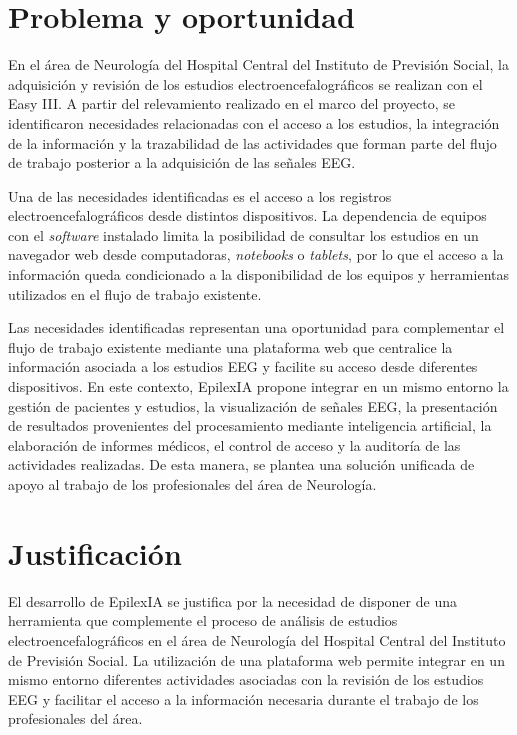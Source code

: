 \section{Problema y oportunidad}
\label{sec:problema-oportunidad}

En el área de Neurología del Hospital Central del Instituto de Previsión Social, la adquisición y revisión de los estudios electroencefalográficos se realizan con el Easy III. A partir del relevamiento realizado en el marco del proyecto, se identificaron necesidades relacionadas con el acceso a los estudios, la integración de la información y la trazabilidad de las actividades que forman parte del flujo de trabajo posterior a la adquisición de las señales EEG.

Una de las necesidades identificadas es el acceso a los registros electroencefalográficos desde distintos dispositivos. La dependencia de equipos con el \textit{software} instalado limita la
posibilidad de consultar los estudios en un navegador web desde computadoras, \textit{notebooks} o \textit{tablets}, por lo que el acceso a la información queda condicionado a la disponibilidad de los equipos y herramientas utilizados en el flujo de trabajo existente.

Las necesidades identificadas representan una oportunidad para
complementar el flujo de trabajo existente mediante una plataforma web
que centralice la información asociada a los estudios EEG y facilite
su acceso desde diferentes dispositivos. En este contexto, EpilexIA
propone integrar en un mismo entorno la gestión de pacientes y estudios,
la visualización de señales EEG, la presentación de resultados
provenientes del procesamiento mediante inteligencia artificial,
la elaboración de informes médicos, el control de acceso y la
auditoría de las actividades realizadas. De esta manera, se plantea
una solución unificada de apoyo al trabajo de los profesionales del
área de Neurología.

\section{Justificación}
\label{sec:justificacion}

El desarrollo de EpilexIA se justifica por la necesidad de disponer de una
herramienta que complemente el proceso de análisis de estudios
electroencefalográficos en el área de Neurología del Hospital Central del
Instituto de Previsión Social. La utilización de una plataforma web permite integrar en un mismo
entorno diferentes actividades asociadas con la revisión de los
estudios EEG y facilitar el acceso a la información necesaria
durante el trabajo de los profesionales del área.


